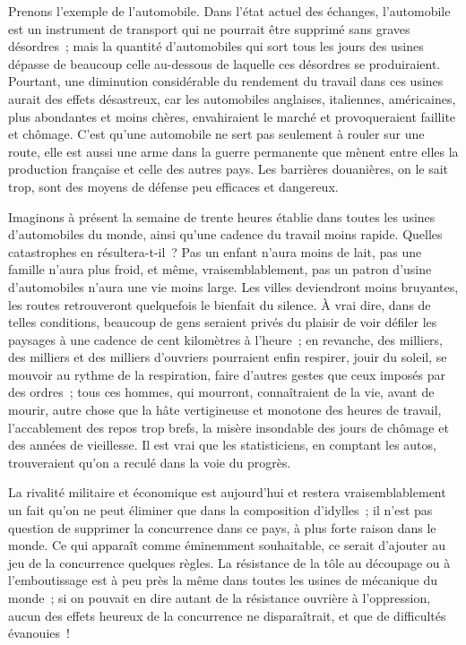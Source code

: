 \documentclass[french,twoside]{book} %
\begin{document}
Prenons l'exemple de l'automobile. Dans l'état actuel des échanges, l'automobile est un instrument de transport qui ne pourrait être supprimé sans graves désordres ; mais la quantité d'automobiles qui sort tous les jours des usines dépasse de beaucoup celle au-dessous de laquelle ces désordres se produiraient. Pourtant, une diminution considérable du rendement du travail dans ces usines aurait des effets désastreux, car les automobiles anglaises, italiennes, américaines, plus abondantes et moins chères, envahiraient le marché et provoqueraient faillite et chômage. C'est qu'une automobile ne sert pas seulement à rouler sur une route, elle est aussi une arme dans la guerre permanente que mènent entre elles la production française et celle des autres pays. Les barrières douanières, on le sait trop, sont des moyens de défense peu efficaces et dangereux.\par
Imaginons à présent la semaine de trente heures établie dans toutes les usines d'automobiles du monde, ainsi qu'une cadence du travail moins rapide. Quelles catastrophes en résultera-t-il ? Pas un enfant n'aura moins de lait, pas une famille n'aura plus froid, et même, vraisemblablement, pas un patron d'usine d'automobiles n'aura une vie moins large. Les villes deviendront moins bruyantes, les routes retrouveront quelquefois le bienfait du silence. À vrai dire, dans de telles conditions, beaucoup de gens seraient privés du plaisir de voir défiler les paysages à une cadence de cent kilomètres à l'heure ; en revanche, des milliers, des milliers et des milliers d'ouvriers pourraient enfin respirer, jouir du soleil, se mouvoir au rythme de la respiration, faire d'autres gestes que ceux imposés par des ordres ; tous ces hommes, qui mourront, connaîtraient de la vie, avant de mourir, autre chose que la hâte vertigineuse et monotone des heures de travail, l'accablement des repos trop brefs, la misère insondable des jours de chômage et des années de vieillesse. Il est vrai que les statisticiens, en comptant les autos, trouveraient qu'on a reculé dans la voie du progrès.\par
La rivalité militaire et économique est aujourd'hui et restera vraisemblablement un fait qu'on ne peut éliminer que dans la composition d'idylles ; il n'est pas question de supprimer la concurrence dans ce pays, à plus forte raison dans le monde. Ce qui apparaît comme éminemment souhaitable, ce serait d'ajouter au jeu de la concurrence quelques règles. La résistance de la tôle au découpage ou à l'emboutissage est à peu près la même dans toutes les usines de mécanique du monde ; si on pouvait en dire autant de la résistance ouvrière à l'oppression, aucun des effets heureux de la concurrence ne disparaîtrait, et que de difficultés évanouies !\par
\end{document}
